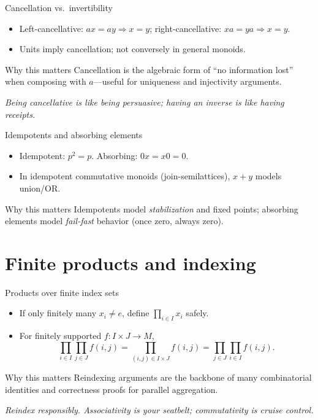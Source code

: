\documentclass[aspectratio=169,11pt]{beamer}
\newcommand{\tline}[1]{\par\medskip\textcolor{transit}{\emph{#1}}\par\medskip}
\begin{document}
\begin{frame}{Cancellation vs.\ invertibility}
\begin{itemize}
  \item Left-cancellative: $ax=ay\Rightarrow x=y$; right-cancellative: $xa=ya\Rightarrow x=y$.
  \item Units imply cancellation; not conversely in general monoids.
\end{itemize}
\begin{alertblock}{Why this matters}
Cancellation is the algebraic form of “no information lost” when composing with $a$—useful for uniqueness and injectivity arguments.
\end{alertblock}
\tline{Being cancellative is like being persuasive; having an inverse is like having receipts.}
\end{frame}

\begin{frame}{Idempotents and absorbing elements}
\begin{itemize}
  \item Idempotent: $p^2=p$. Absorbing: $0x=x0=0$.
  \item In idempotent commutative monoids (join-semilattices), $x+y$ models union/OR.
\end{itemize}
\begin{alertblock}{Why this matters}
Idempotents model \emph{stabilization} and fixed points; absorbing elements model \emph{fail-fast} behavior (once zero, always zero).
\end{alertblock}
\end{frame}

\section{Finite products and indexing}
\begin{frame}{Products over finite index sets}
\begin{itemize}
  \item If only finitely many $x_i\neq e$, define $\prod_{i\in I}x_i$ safely.
  \item For finitely supported $f:I\times J\to M$,
  \[
    \prod_{i\in I}\prod_{j\in J} f(i,j)=\prod_{(i,j)\in I\times J} f(i,j)=\prod_{j\in J}\prod_{i\in I} f(i,j).
  \]
\end{itemize}
\begin{alertblock}{Why this matters}
Reindexing arguments are the backbone of many combinatorial identities and correctness proofs for parallel aggregation.
\end{alertblock}
\tline{Reindex responsibly. Associativity is your seatbelt; commutativity is cruise control.}
\end{frame}
\end{document}
